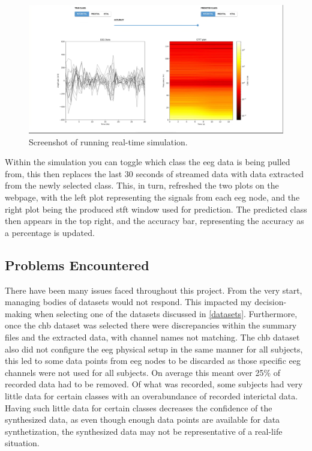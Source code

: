 \documentclass[12pt]{article}
\begin{document}
\begin{figure}[H]
\includegraphics[width=\textwidth]{real-time}
\centering
\caption{Screenshot of running real-time simulation.}
\label{fig:real-time}
\end{figure}

Within the simulation you can toggle which class the \acrshort{eeg} data is being pulled from, this then replaces the last 30 seconds of streamed data with data extracted from the newly selected class. This, in turn, refreshed the two plots on the webpage, with the left plot representing the signals from each \acrshort{eeg} node, and the right plot being the produced \acrshort{stft} window used for prediction. The predicted class then appears in the top right, and the accuracy bar, representing the accuracy as a percentage is updated.


\subsection{Problems Encountered}\label{issues}


There have been many issues faced throughout this project. From the very start, managing bodies of datasets would not respond. This impacted my decision-making when selecting one of the datasets discussed in \ref{datasets}. Furthermore, once the \acrshort{chb} dataset was selected there were discrepancies within the summary files and the extracted data, with channel names not matching. The \acrshort{chb} dataset also did not configure the \acrshort{eeg} physical setup in the same manner for all subjects, this led to some data points from \acrshort{eeg} nodes to be discarded as those specific \acrshort{eeg} channels were not used for all subjects. On average this meant over 25\% of recorded data had to be removed. Of what was recorded, some subjects had very little data for certain classes with an overabundance of recorded interictal data. Having such little data for certain classes decreases the confidence of the synthesized data, as even though enough data points are available for data synthetization, the synthesized data may not be representative of a real-life situation.
\end{document}
